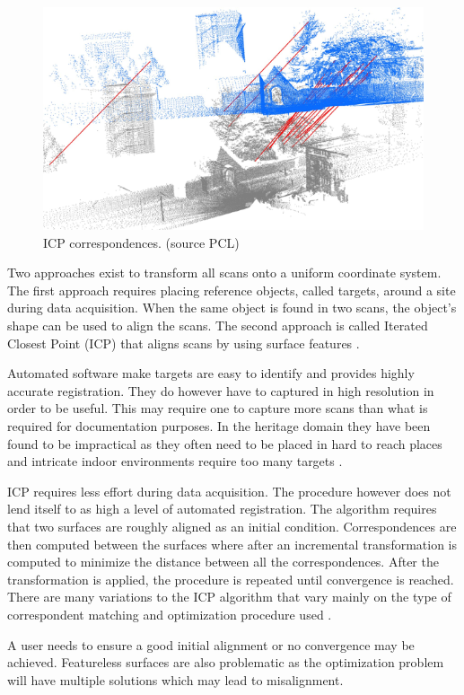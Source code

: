 \begin{figure}[ht]
  \centering
  \includegraphics[width=0.6\linewidth]{images/registration}
  \caption{ICP correspondences. (source PCL) }
  \label{fig:mixed-pixel}
\end{figure}

Two approaches exist to transform all scans onto a uniform coordinate system. The first approach requires placing reference objects, called targets, around a site during data acquisition. When the same object is found in two scans, the object's shape can be used to align the scans. The second approach is called Iterated Closest Point (ICP) that aligns scans by using surface features \cite{Besl1992}.

Automated software make targets are easy to identify and provides highly accurate registration. They do however have to captured in high resolution in order to be useful. This may require one to capture more scans than what is required for documentation purposes. In the heritage domain they have been found to be impractical as they often need to be placed in hard to reach places and intricate indoor environments require too many targets \cite{Ruther2011}. 

ICP requires less effort during data acquisition. The procedure however does not lend itself to as high a level of automated registration. The algorithm requires that two surfaces are roughly aligned as an initial condition. Correspondences are then computed between the surfaces where after an incremental transformation is computed to minimize the distance between all the correspondences. After the transformation is applied, the procedure is repeated until convergence is reached. There are many variations to the ICP algorithm that vary mainly on the type of correspondent matching and optimization procedure used \cite{Besl1992}.  

A user needs to ensure a good initial alignment or no convergence may be achieved. Featureless surfaces are also problematic as the optimization problem will have multiple solutions which may lead to misalignment.

